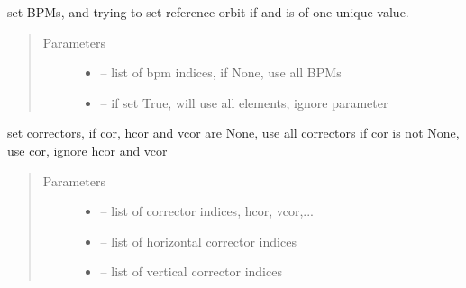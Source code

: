 \documentclass[letterpaper,10pt,english]{sphinxmanual}
\begin{document}
\begin{fulllineitems}
\begin{fulllineitems}
\end{fulllineitems}


\begin{fulllineitems}
\label{\detokenize{src/apidocs/dakopt:genopt.dakopt.DakotaOC.set_bpms}}
set BPMs, and trying to set reference orbit  if  and 
is of one unique value.
\begin{quote}\begin{description}
\item[{Parameters}] \leavevmode\begin{itemize}
\item {} 
 -- list of bpm indices, if None, use all BPMs

\item {} 
 -- if set True, will use all elements, ignore  parameter

\end{itemize}

\end{description}\end{quote}

\end{fulllineitems}


\begin{fulllineitems}
\label{\detokenize{src/apidocs/dakopt:genopt.dakopt.DakotaOC.set_cors}}
set correctors, if cor, hcor and vcor are None, use all correctors
if cor is not None, use cor, ignore hcor and vcor
\begin{quote}\begin{description}
\item[{Parameters}] \leavevmode\begin{itemize}
\item {} 
 -- list of corrector indices, hcor, vcor,...

\item {} 
 -- list of horizontal corrector indices

\item {} 
 -- list of vertical corrector indices


\end{itemize}
\end{description}
\end{quote}
\end{fulllineitems}
\end{fulllineitems}
\end{document}
